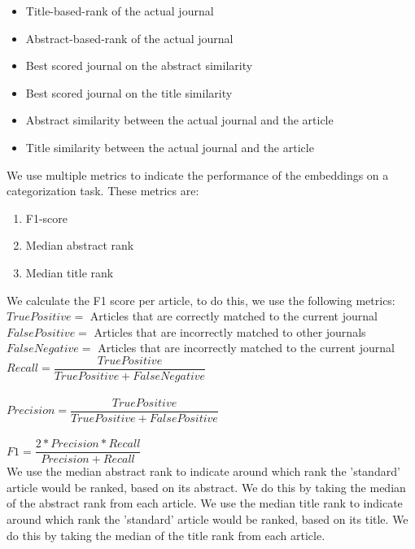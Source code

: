 \documentclass[../../Thesis.tex]{subfiles}
\begin{document}
\begin{itemize}
\item{Title-based-rank of the actual journal}
\item{Abstract-based-rank of the actual journal}
\item{Best scored journal on the abstract similarity}
\item{Best scored journal on the title similarity}
\item{Abstract similarity between the actual journal and the article}
\item{Title similarity between the actual journal and the article}
\end{itemize}
We use multiple metrics to indicate the performance of the embeddings on a categorization task. These metrics are:
\begin{enumerate}
\item{F1-score}
\item{Median abstract rank}
\item{Median title rank}
\end{enumerate}
We calculate the F1 score per article, to do this, we use the following metrics:\\
$True Positive = $ Articles that are correctly matched to the current journal\\
$False Positive = $ Articles that are incorrectly matched to other journals\\
$False Negative = $ Articles that are incorrectly matched to the current journal\\
$Recall = \dfrac{True Positive}{True Positive + False Negative}$\\\\
$Precision = \dfrac{True Positive}{True Positive + False Positive}$\\\\
$F1 = \dfrac{2 * Precision * Recall}{Precision + Recall}$\\
We use the median abstract rank to indicate around which rank the 'standard' article would be ranked, based on its abstract. We do this by taking the median of the abstract rank from each article.
We use the median title rank to indicate around which rank the 'standard' article would be ranked, based on its title. We do this by taking the median of the title rank from each article.
\end{document}
